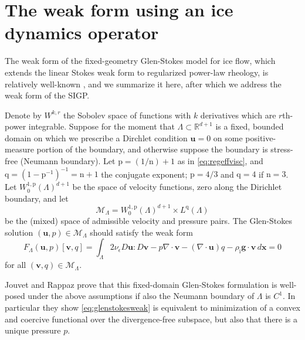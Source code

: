 \documentclass[letterpaper,final,12pt,reqno]{amsart}
\theoremstyle{claim}
\newcommand{\eps}{\epsilon}
\newcommand{\RR}{\mathbb{R}}
\newcommand{\Div}{\nabla\cdot}
\newcommand{\bg}{\mathbf{g}}
\newcommand{\bu}{\mathbf{u}}
\newcommand{\bv}{\mathbf{v}}
\newcommand{\bx}{\mathbf{x}}
\newcommand{\rhoi}{\rho_{\text{i}}}
\newcommand{\nn}{{\text{n}}}
\newcommand{\pp}{{\text{p}}}
\newcommand{\qq}{{\text{q}}}
\numberwithin{equation}{section}
\numberwithin{figure}{section}
\numberwithin{table}{section}
\numberwithin{theorem}{section}
\begin{document}
\section{The weak form using an ice dynamics operator} \label{sec:weakido}

The weak form of the fixed-geometry Glen-Stokes model for ice flow, which extends the linear Stokes weak form \cite{Elmanetal2014} to regularized power-law rheology, is relatively well-known \cite{IsaacStadlerGhattas2015,JouvetRappaz2011,Lengetal2012}, and we summarize it here, after which we address the weak form of the SIGP.

Denote by $W^{k,r}$ the Sobolev space \cite{Evans2010} of functions with $k$ derivatives which are $r$th-power integrable.  Suppose for the moment that $\Lambda \subset \RR^{d+1}$ is a fixed, bounded domain on which we prescribe a Dirchlet condition $\bu=0$ on some positive-measure portion of the boundary, and otherwise suppose the boundary is stress-free (Neumann boundary).  Let $\pp=(1/\nn)+1$ as in \eqref{eq:regeffvisc}, and $\qq=(1-\pp^{-1})^{-1}=\nn+1$ the conjugate exponent; $\pp=4/3$ and $\qq = 4$ if $\nn=3$.  Let $W_0^{1,\pp}(\Lambda)^{d+1}$ be the space of velocity functions, zero along the Dirichlet boundary, and let
\begin{equation}
\mathcal{M}_\Lambda = W_0^{1,\pp}(\Lambda)^{d+1} \times L^\qq(\Lambda)  \label{eq:mixed}
\end{equation}
be the (mixed) space of admissible velocity and pressure pairs.  The Glen-Stokes solution $(\bu,p) \in \mathcal{M}_\Lambda$ should satisfy the weak form
\begin{equation}
F_\Lambda(\bu,p)[\bv,q] = \int_\Lambda 2 \nu_\eps D\bu : D\bv - p \Div\bv - (\Div\bu) q - \rhoi \bg \cdot \bv\,d\bx = 0 \label{eq:glenstokesweak}
\end{equation}
for all $(\bv,q) \in \mathcal{M}_\Lambda$.

Jouvet and Rappaz \cite{JouvetRappaz2011} prove that this fixed-domain Glen-Stokes formulation is well-posed under the above assumptions if also the Neumann boundary of $\Lambda$ is $C^1$.  In particular they show \eqref{eq:glenstokesweak} is equivalent to minimization of a convex and coercive functional over the divergence-free subspace, but also that there is a unique pressure $p$.
\end{document}
